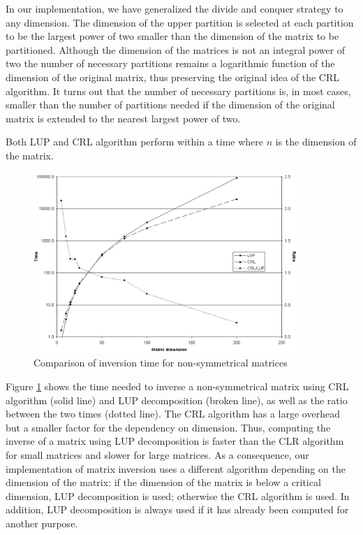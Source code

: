  In our implementation, we have
generalized the divide and conquer strategy to any dimension. The
dimension of the upper partition is selected at each partition to
be the largest power of two smaller than the dimension of the
matrix to be partitioned. Although the dimension of the matrices
is not an integral power of two the number of necessary partitions
remains a logarithmic function of the dimension of the original
matrix, thus preserving the original idea of the CRL algorithm. It
turns out that the number of necessary partitions is, in most
cases, smaller than the number of partitions needed if the
dimension of the original matrix is extended to the nearest
largest power of two.

Both LUP and CRL algorithm perform within a time  where
$n$ is the dimension of the matrix.
\begin{figure}
\centering\includegraphics[width=10cm]{Figures/InversionTime}
\caption{Comparison of inversion time for non-symmetrical
matrices}\label{fig:inversionTime}
\end{figure}
Figure \ref{fig:inversionTime} shows the time needed to inverse a
non-symmetrical matrix using CRL algorithm (solid line) and LUP
decomposition (broken line), as well as the ratio between the two
times (dotted line). The CRL algorithm has a large overhead but a
smaller factor for the dependency on dimension. Thus, computing
the inverse of a matrix using LUP decomposition is faster than the
CLR algorithm for small matrices and slower for large matrices. As
a consequence, our implementation of matrix inversion uses a
different algorithm depending on the dimension of the matrix: if
the dimension of the matrix is below a critical dimension, LUP
decomposition is used; otherwise the CRL algorithm is used. In
addition, LUP decomposition is always used if it has already been
computed for another purpose.

